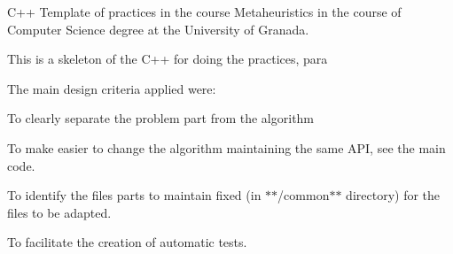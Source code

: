 C++ Template of practices in the course Metaheuristics in the course of Computer Science degree at the University of Granada.

This is a skeleton of the C++ for doing the practices, para

The main design criteria applied were\+:


\begin{DoxyItemize}
\item To clearly separate the problem part from the algorithm
\item To make easier to change the algorithm maintaining the same API, see the main code.
\item To identify the files parts to maintain fixed (in $\ast$$\ast$/common$\ast$$\ast$ directory) for the files to be adapted.
\item To facilitate the creation of automatic tests. 
\end{DoxyItemize}